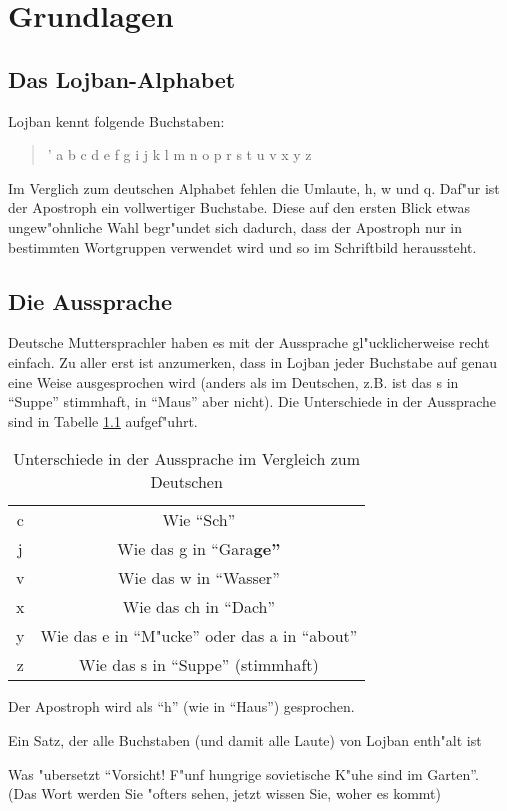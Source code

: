 \chapter{Grundlagen}
\section{Das Lojban-Alphabet}
Lojban kennt folgende Buchstaben:
\begin{quote}
' a b c d e f g i j k l m n o p r s t u v x y z
\end{quote}
Im Verglich zum deutschen Alphabet fehlen die Umlaute, h, w und q. Daf"ur ist der Apostroph ein vollwertiger Buchstabe. Diese
auf den ersten Blick etwas ungew"ohnliche Wahl begr"undet sich dadurch, dass der Apostroph nur in bestimmten Wortgruppen verwendet wird
und so im Schriftbild heraussteht.

\section{Die Aussprache}
Deutsche Muttersprachler haben es mit der Aussprache gl"ucklicherweise recht einfach. Zu aller erst ist anzumerken, dass in Lojban jeder Buchstabe auf genau eine Weise ausgesprochen wird (anders als im Deutschen, z.B. ist das s in ``Suppe'' stimmhaft, in ``Maus'' aber nicht).
Die Unterschiede in der Aussprache sind in Tabelle \ref{tbl:aussprache} aufgef"uhrt.
\begin{table}
\centering
\begin{tabular}{|c|c|}
\hline
c & Wie ``Sch'' \\
j & Wie das g in ``Gara\bf{g}e'' \\ %
v & Wie das w in ``Wasser''\\
x & Wie das ch in ``Dach'' \\
y & Wie das e in ``M"ucke'' oder das a in ``about'' \\
z & Wie das s in ``Suppe'' (stimmhaft) \\
\hline
\end{tabular}
\caption{Unterschiede in der Aussprache im Vergleich zum Deutschen}
\label{tbl:aussprache}
\end{table}
Der Apostroph wird als ``h'' (wie in ``Haus'') gesprochen.

Ein Satz, der alle Buchstaben (und damit alle Laute) von Lojban enth"alt ist
\begin{quote}
\end{quote}
Was "ubersetzt ``Vorsicht! F"unf hungrige sovietische K"uhe sind im Garten''. (Das Wort  werden Sie "ofters sehen, jetzt wissen
Sie, woher es kommt)

